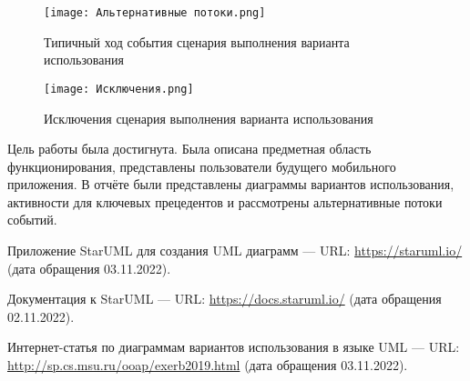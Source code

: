 \documentclass[14pt]{extreport}
\begin{document}
\begin{figure}[H]
\centerline{\texttt{[image: Альтернативные потоки.png]}}
\caption{Типичный ход события сценария выполнения варианта использования}
\label{fig13}
\end{figure}

\begin{figure}[H]
\centerline{\texttt{[image: Исключения.png]}}
\caption{Исключения сценария выполнения варианта использования}
\label{fig14}
\end{figure}

\conclusions

Цель работы была достигнута. Была описана предметная область функционирования, представлены пользователи будущего мобильного приложения. В отчёте были представлены диаграммы вариантов использования, активности для ключевых прецедентов и рассмотрены альтернативные потоки событий.

\newpage
\begin{thebibliography}{99}

Приложение StarUML для создания UML диаграмм — URL: \url{https://staruml.io/} (дата обращения 03.11.2022).	

Документация к StarUML — URL: \url{https://docs.staruml.io/} (дата обращения 02.11.2022).	

Интернет-статья по диаграммам вариантов использования в языке UML — URL: \url{http://sp.cs.msu.ru/ooap/exerb2019.html} (дата обращения 03.11.2022).	
	
\end{thebibliography}
\end{document}
